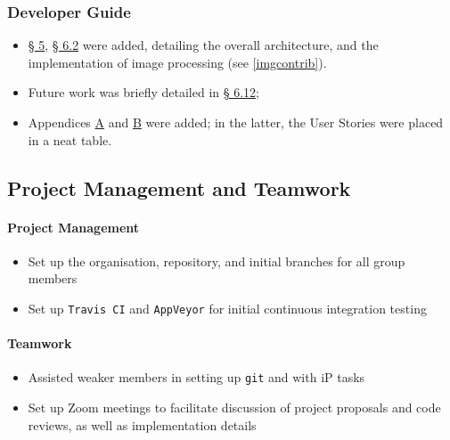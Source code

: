 \documentclass[11pt,british]{article}
\begin{document}
\subsubsection{Developer Guide}
\begin{itemize}
	\item \href{https://ay1920s2-cs2103t-w12-4.github.io/main/DeveloperGuide.html#design}{\S{} 5}, \href{https://ay1920s2-cs2103t-w12-4.github.io/main/DeveloperGuide.html#image-management-done-by-sharadh-rajaraman}{\S{} 6.2} were added, detailing the overall architecture, and the implementation of image processing (see \cref{imgcontrib}).
	\item Future work was briefly detailed in \href{https://ay1920s2-cs2103t-w12-4.github.io/main/DeveloperGuide.html#Implementation-Future}{\S{} 6.12};
	\item Appendices \href{https://ay1920s2-cs2103t-w12-4.github.io/main/DeveloperGuide.html#product-scope-done-by-zain-alam-sharadh-rajaraman}{A} and \href{https://ay1920s2-cs2103t-w12-4.github.io/main/DeveloperGuide.html#user-stories-done-by-sharadh-rajaraman-and-adarsh-chugani}{B} were added; in the latter, the User Stories were placed in a neat table.
\end{itemize}

\subsection{Project Management and Teamwork}
\paragraph{Project Management}
\begin{itemize}
	\item Set up the organisation, repository, and initial branches for all group members
	\item Set up \texttt{Travis CI} and \texttt{AppVeyor} for initial continuous integration testing
\end{itemize}

\paragraph{Teamwork}
\begin{itemize}
	\item Assisted weaker members in setting up \texttt{git} and with iP tasks
	\item Set up Zoom meetings to facilitate discussion of project proposals and code reviews, as well as implementation details
\end{itemize}
\end{document}
